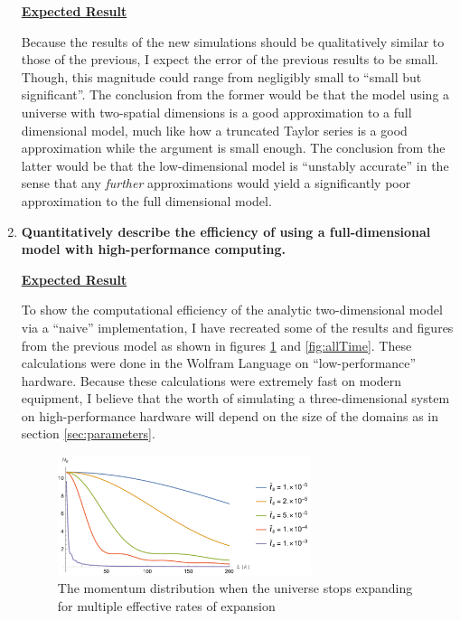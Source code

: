 \documentclass{article}
\begin{document}
\begin{enumerate}
                \underline{\textbf{Expected Result}}

                Because the results of the new simulations should be qualitatively similar to those of the previous, I expect the error of the previous results to be small.  Though, this magnitude could range from negligibly small to ``small but significant''.  The conclusion from the former would be that the model using a universe with two-spatial dimensions is a good approximation to a full dimensional model, much like how a truncated Taylor series is a good approximation while the argument is small enough.  The conclusion from the latter would be that the low-dimensional model is ``unstably accurate'' in the sense that any \emph{further} approximations would yield a significantly poor approximation to the full dimensional model.
                
            \item \textbf{Quantitatively describe the efficiency of using a full-dimensional model with high-performance computing.}

                \underline{\textbf{Expected Result}}

                To show the computational efficiency of the analytic two-dimensional model via a ``naive'' implementation, I have recreated some of the results and figures from the previous model\cite{Jain} as shown in figures \ref{fig:finalTime} and \ref{fig:allTime}.  These calculations were done in the Wolfram Language on ``low-performance'' hardware.  Because these calculations were extremely fast on modern equipment, I believe that the worth of simulating a three-dimensional system on high-performance hardware will depend on the size of the domains as in section \ref{sec:parameters}.

                \begin{figure}[h]
                    \centering
                    \includegraphics[width = 0.7\textwidth]{images/fig2.png}
                    \caption{The momentum distribution when the universe stops expanding for multiple effective rates of expansion}
                    \label{fig:finalTime}
                \end{figure}


\end{enumerate}
\end{document}
